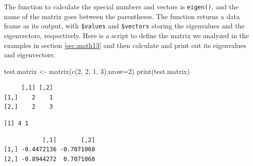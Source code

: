 \documentclass[
  letterpaper,
  DIV=11,
  numbers=noendperiod]{scrreprt}
\newenvironment{Shaded}{\begin{snugshade}}{\end{snugshade}}
\newcommand{\AttributeTok}[1]{\textcolor[rgb]{0.40,0.45,0.13}{#1}}
\newcommand{\DecValTok}[1]{\textcolor[rgb]{0.68,0.00,0.00}{#1}}
\newcommand{\FunctionTok}[1]{\textcolor[rgb]{0.28,0.35,0.67}{#1}}
\newcommand{\NormalTok}[1]{\textcolor[rgb]{0.00,0.23,0.31}{#1}}
\newcommand{\OtherTok}[1]{\textcolor[rgb]{0.00,0.23,0.31}{#1}}
\newcommand{\SpecialCharTok}[1]{\textcolor[rgb]{0.37,0.37,0.37}{#1}}
\begin{document}
The function to calculate the special numbers and vectors is
\texttt{eigen()}, and the name of the matrix goes between the
parentheses. The function returns a data frame as its output, with
\texttt{\$values} and \texttt{\$vectors} storing the eigenvalues and the
eigenvectors, respectively. Here is a script to define the matrix we
analyzed in the examples in section \ref{sec:math13} and then calculate
and print out its eigenvalues and eigenvectors:

\begin{Shaded}
\begin{Highlighting}[]
\NormalTok{test.matrix }\OtherTok{\textless{}{-}} \FunctionTok{matrix}\NormalTok{(}\FunctionTok{c}\NormalTok{(}\DecValTok{2}\NormalTok{,  }\DecValTok{2}\NormalTok{, }\DecValTok{1}\NormalTok{, }\DecValTok{3}\NormalTok{),}\AttributeTok{nrow=}\DecValTok{2}\NormalTok{)}
\FunctionTok{print}\NormalTok{(test.matrix)}
\end{Highlighting}
\end{Shaded}

\begin{verbatim}
     [,1] [,2]
[1,]    2    1
[2,]    2    3
\end{verbatim}

\begin{Shaded}
\end{Shaded}

\begin{verbatim}
[1] 4 1
\end{verbatim}

\begin{Shaded}
\end{Shaded}

\begin{verbatim}
           [,1]       [,2]
[1,] -0.4472136 -0.7071068
[2,] -0.8944272  0.7071068
\end{verbatim}
\end{document}
